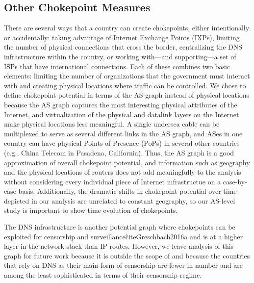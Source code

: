 \subsection{Other Chokepoint Measures}
There are several ways that a country can create chokepoints, either intentionally or accidentally: taking advantage of Internet Exchange Points (IXPs),
limiting the number of physical connections that cross the border, centralizing
the DNS infrastructure within the country, or working
with---and supporting---a set of ISPs that have international connections.
Each of these combines two basic elements: limiting the number of organizations that the government must interact with and creating physical locations where traffic can be controlled.
We chose to define chokepoint potential in terms of the AS graph instead of physical locations because the AS graph captures the most interesting physical attributes of the Internet, and
virtualization of the physical and datalink layers on the Internet make physical locations less meaningful. A single undersea cable can be multiplexed to serve as several different links in
the AS graph, and ASes in one country can have physical Points of Presence (PoPs) in several other countries (e.g., China Telecom in Pasadena, California). Thus, the AS graph is a good approximation
of overall chokepoint potential, and information such as geography and the physical locations of routers does not add meaningfully to the analysis without considering every individual piece of Internet
infrastructue on a case-by-case basis. Additionally, the dramatic shifts in chokepoint potential over time depicted in our analysis are unrelated to constant geography, so our AS-level study is important
to show time evolution of chokepoints.

The DNS infrastructure is another potential graph where chokepoints can be
exploited for censorship and surveillance\~cite{Greschbach2016a} and is at a
higher layer in the network stack than IP routes.  However, we leave analysis of
this graph for future work because it is outside the scope of \toolname{} and
because the countries that rely on DNS as their main form of censorship are
fewer in number and are among the least sophisticated in terms of their
censorship regime.


